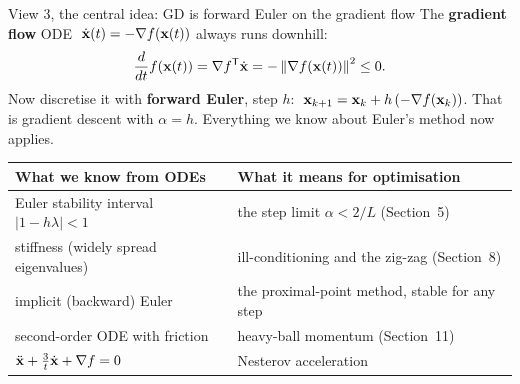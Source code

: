 \begin{frame}{View 3, the central idea: GD is forward Euler on the gradient flow}
  The \textbf{gradient flow} ODE $\;\dot{\mathbf{x}}(t) = -\nabla f(\mathbf{x}(t))$ always runs downhill:
  \[
    \frac{d}{dt}f(\mathbf{x}(t)) = \nabla f^{\mathsf T}\dot{\mathbf{x}} = -\left\lVert \nabla f(\mathbf{x}(t)) \right\rVert^2 \le 0 .
  \]
  Now discretise it with \textbf{forward Euler}, step $h$: $\;\mathbf{x}_{k+1} = \mathbf{x}_k + h\,(-\nabla f(\mathbf{x}_k))$.
  That is \alert{gradient descent with $\alpha = h$}. Everything we know about Euler's method now applies.

  \vspace{4pt}
  \centering\small
  \begin{tabular}{@{}l l@{}}
    \toprule
    What we know from ODEs & What it means for optimisation \\
    \midrule
    Euler stability interval $|1 - h\lambda| < 1$ & the step limit $\alpha < 2/L$ (Section~5) \\
    stiffness (widely spread eigenvalues) & ill-conditioning and the zig-zag (Section~8) \\
    implicit (backward) Euler & the proximal-point method, stable for any step \\
    second-order ODE with friction & heavy-ball momentum (Section~11) \\
    $\ddot{\mathbf{x}} + \tfrac3t\dot{\mathbf{x}} + \nabla f = 0$ & Nesterov acceleration~\cite{su2016} \\
    \bottomrule
  \end{tabular}
\end{frame}


